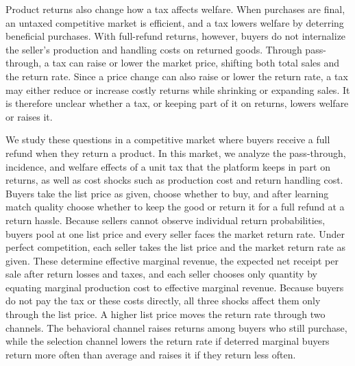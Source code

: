 \documentclass[11pt]{article}
\begin{document}
Product returns also change how a tax affects welfare. When purchases are
final, an untaxed competitive market is efficient, and a tax lowers welfare by
deterring beneficial purchases. With full-refund returns, however, buyers do
not internalize the seller's production and handling costs on returned goods.
Through pass-through, a tax can raise or lower the market price, shifting both
total sales and the return rate. Since a price change can also raise or lower
the return rate, a tax may either reduce or increase costly returns while
shrinking or expanding sales. It is therefore unclear whether a tax, or
keeping part of it on returns, lowers welfare or raises it.

We study these questions in a competitive market where buyers receive a full
refund when they return a product. In this market, we analyze the
pass-through, incidence, and welfare effects of a unit tax that the platform
keeps in part on returns, as well as cost shocks such as production cost and
return handling cost. Buyers take the list price as given, choose whether to
buy, and after learning match quality choose whether to keep the good or
return it for a full refund at a return hassle. Because sellers cannot observe
individual return probabilities, buyers pool at one list price and every seller
faces the market return rate. Under perfect competition, each seller takes the
list price and the market return rate as given. These determine effective marginal revenue, the expected
net receipt per sale after return losses and taxes, and each seller chooses
only quantity by equating marginal production cost to effective marginal
revenue. Because buyers do not pay the tax or these costs directly, all three
shocks affect them only through the list price. A higher list price moves the return rate through two channels. The
behavioral channel raises returns among buyers who still purchase, while the
selection channel lowers the return rate if deterred marginal buyers return
more often than average and raises it if they return less often.
\end{document}
